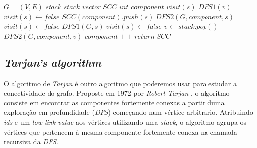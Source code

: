 \documentclass[12pt,a4paper]{report}
\begin{document}
		\begin{center}
			\begin{algorithmic}[1]
				\State $G = (V, E)$
				\State $stack$ $stack$
				\State $vector$ $SCC$
				\State $int$ $component$
				\newline
					\State $visit(s)$
							\State $DFS1(v)$
						\EndIf
					\EndFor
				\EndFunction
				\newline
					\State $visit(s) \leftarrow false$
					\State $SCC(component).push(s)$
							\State $DFS2(G, component, s)$
						\EndIf
					\EndFor
				\EndFunction
				\newline
						\State $visit(s) \leftarrow false$
					\EndFor
						\State $DFS1(G,s)$
					\EndFor
						\State $visit(s) \leftarrow false$
					\EndFor
						\State $v \leftarrow stack.pop()$
							\State $DFS2(G, component, v)$
						\EndIf
						\State $component++$
					\EndWhile
					\State $return$ $SCC$
				\EndFunction
			\end{algorithmic}
		\end{center}


		\subsection{\textit{Tarjan's algorithm}}
		O algoritmo de \textit{Tarjan} é outro algoritmo que poderemos usar para estudar a conectividade do grafo. Proposto em 1972 por \textit{Robert Tarjan} \cite{tarjan}, o algoritmo consiste em encontrar as componentes fortemente conexas a partir duma exploração em profundidade (\textit{DFS}) começando num vértice arbitrário. Atribuindo \textit{ids} e um \textit{low-link value} aos vértices utilizando uma \textit{stack}, o algoritmo agrupa os vértices que pertencem à mesma componente fortemente conexa na chamada recursiva da \textit{DFS}.
\end{document}
